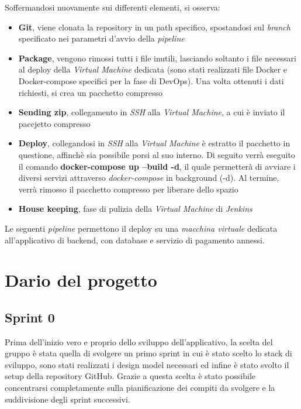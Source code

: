 \documentclass{article}
\begin{document}
Soffermandosi nuovamente sui differenti elementi, si osserva:
\begin{itemize}[label = {-}]
    \itemsep0em
    \item \textbf{Git}, viene clonata la repository in un path specifico, spostandosi sul \textit{branch} specificato nei parametri d'avvio della \textit{pipeline}
    \item \textbf{Package}, vengono rimossi tutti i file inutili, lasciando soltanto i file necessari al deploy della \textit{Virtual Machine} dedicata (sono stati realizzati file Docker e Docker-compose specifici per la fase di DevOps). Una volta ottenuti i dati richiesti, si crea un pacchetto compresso
    \item \textbf{Sending zip}, collegamento in \textit{SSH} alla \textit{Virtual Machine}, a cui è inviato il paccjetto compresso
    \item \textbf{Deploy}, collegandosi in \textit{SSH} alla \textit{Virtual Machine} è estratto il pacchetto in questione, affinchè sia possibile porsi al suo interno. Di seguito verrà eseguito il comando \textbf{docker-compose up --build -d}, il quale permetterà di avviare i diversi servizi attraverso \textit{docker-compose} in background (-d). Al termine, verrà rimosso il pacchetto compresso per liberare dello spazio
    \item \textbf{House keeping}, fase di pulizia della \textit{Virtual Machine} di \textit{Jenkins}
\end{itemize}
Le seguenti \textit{pipeline} permettono il deploy su una \textit{macchina virtuale} dedicata all'applicativo di backend, con database e servizio di pagamento annessi.

\section{Dario del progetto}

\subsection{Sprint 0}
Prima dell'inizio vero e proprio dello sviluppo dell'applicativo, la scelta del gruppo è stata quella di svolgere un primo sprint in cui è stato scelto lo stack di sviluppo, sono stati realizzati i design model necessari ed infine è stato svolto il setup della repository GitHub. Grazie a questa scelta è stato possibile concentrarsi completamente sulla pianificazione dei compiti da svolgere e la suddivisione degli sprint successivi.
\end{document}
